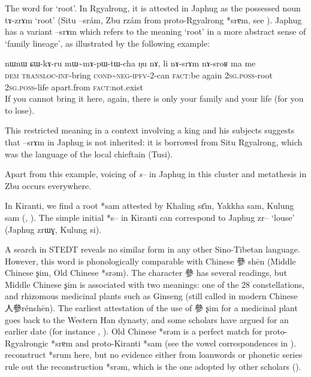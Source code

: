 \documentclass[oldfontcommands,oneside,a4paper,11pt]{article}
\newcommand{\ipa}[1]{{\phon #1}} %
\newcommand{\zh}[1]{{\cn #1}}
\begin{document}
The word for `root'. In Rgyalrong, it is attested in Japhug as the possessed noun \ipa{tɤ-zrɤm} `root' (Situ \ipa{--srám}, Zbu \ipa{rzám} from proto-Rgyalrong *\ipa{srɐm}, see \citealt[243]{jacques04these}). Japhug has a variant \ipa{--srɤm} which refers to the meaning `root' in a more abstract sense of `family lineage', as illustrated by the following example:

\begin{exe}
\ex \label{ex:sram}
\gll
\ipa{nɯnɯ} 	\ipa{ɕɯ-kɤ-ru} 	\ipa{mɯ\textasciitilde{}mɤ-pɯ-tɯ-cha} 	\ipa{ŋu} 	\ipa{nɤ,} 	\ipa{li} 	\ipa{nɤ-srɤm} 	\ipa{nɤ-sroʁ} 	\ipa{ma} 	\ipa{me} \\
\textsc{dem} \textsc{transloc-inf}-bring \textsc{cond\textasciitilde{}neg-ipfv}-2-can \textsc{fact}:be again \textsc{2sg.poss}-root \textsc{2sg.poss}-life apart.from \textsc{fact}:not.exist\\
\glt If you cannot bring it here, again, there is only your family and your life (for you to lose).
\end{exe}

This restricted meaning in a context involving a king and his subjects suggests that \ipa{--srɤm} in Japhug is not inherited: it is borrowed from Situ Rgyalrong, which was the language of the local chieftain (Tusi).

Apart from this example, voicing of \textit{s--} in Japhug in this cluster and metathesis in Zbu occurs everywhere.

In Kiranti, we find a root *sam attested by Khaling \ipa{sɛ̄m}, Yakkha  \ipa{sam}, Kulung \ipa{sam} (\citealt{kongren07yakkha}, \citealt{tolsma06kulung}). The simple initial *s-- in Kiranti can correspond to Japhug \ipa{zr--} `louse' (Japhug \ipa{zrɯɣ}, Kulung \ipa{si}).

A search in STEDT reveals no similar form in any other Sino-Tibetan language. However, this word is phonologically comparable with Chinese \zh{參} shēn (Middle Chinese \ipa{ʂim}, Old Chinese *\ipa{srəm}). The character  \zh{參} has several readings, but Middle Chinese \ipa{ʂim} is associated with two meanings: one of the 28 constellations, and rhizomous medicinal plants such as Ginseng (still called in modern Chinese \zh{人參}\ipa{rénshēn}). The earliest attestation of the use of \zh{參} \ipa{ʂim} for a medicinal plant goes back to the Western Han dynasty, and some scholars have argued for an earlier date (for instance \citealt{xu11shen}, \citealt{sun92renshen}). Old Chinese *srəm is a perfect match for proto-Rgyalrongic *srɐm and proto-Kiranti *sam (see the vowel correspondences in \citealt{gong95st}). \citet{bs14oc}reconstruct *\ipa{srum} here, but no evidence either from loanwords or phonetic series rule out the reconstruction *\ipa{srəm}, which is the one adopted by other scholars (\citealt{schuessler06}).
\end{document}
